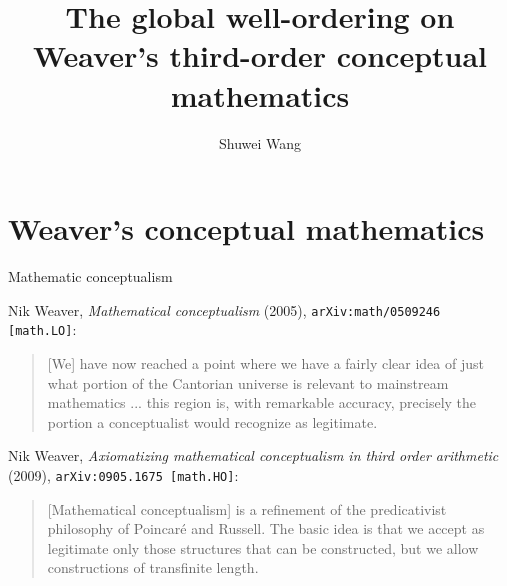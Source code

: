 \documentclass{beamer}
\title{The global well-ordering on Weaver's third-order conceptual mathematics}
\author{Shuwei Wang}
\institute{University of Leeds}
\date{\DTMdate{2024-09-12}}
\begin{document}
\begin{frame}
  \titlepage
\end{frame}

\begin{frame}
  \tableofcontents
\end{frame}

\section[Conceptual mathematics]{Weaver's conceptual mathematics}

\begin{frame}{Mathematic conceptualism}

  {\small Nik Weaver, \emph{Mathematical conceptualism} (2005), \texttt{arXiv:math/0509246 [math.LO]}:}

  \begin{quote}
    [We] have now reached a point where we have a fairly clear idea of just what portion of the Cantorian universe is relevant to mainstream mathematics ... this region is, with remarkable accuracy, precisely the portion a conceptualist would recognize as legitimate.
  \end{quote}

  \vspace*{8pt}

  {\small Nik Weaver, \emph{Axiomatizing mathematical conceptualism in third order arithmetic} (2009), \texttt{arXiv:0905.1675 [math.HO]}:}

  \begin{quote}
    [Mathematical conceptualism] is a refinement of the predicativist philosophy of Poincar\'e and Russell. The basic idea is that we accept as legitimate only those structures that can be constructed, but we allow constructions of transfinite length.
  \end{quote}

  \nocite{weaver05-conceptualism,weaver09-cm}
\end{frame}
\end{document}
